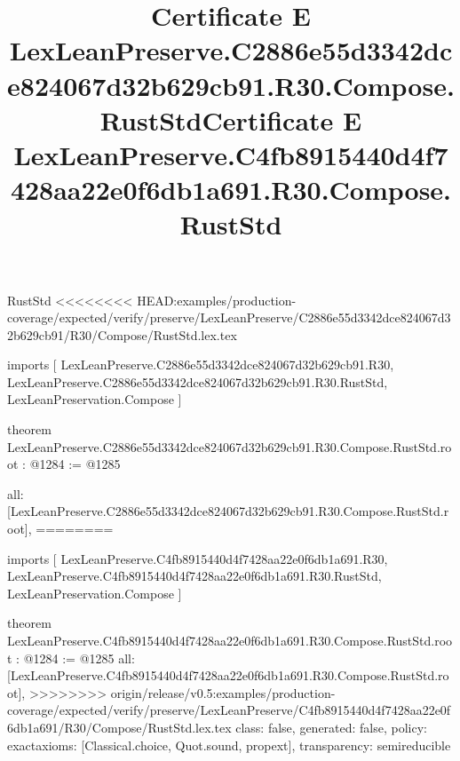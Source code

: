 \begin{lexlean}{RustStd}
<<<<<<<< HEAD:examples/production-coverage/expected/verify/preserve/LexLeanPreserve/C2886e55d3342dce824067d32b629cb91/R30/Compose/RustStd.lex.tex
\title{Certificate E LexLeanPreserve.C2886e55d3342dce824067d32b629cb91.R30.Compose.RustStd}
\begin{coremodule}
imports [
  LexLeanPreserve.C2886e55d3342dce824067d32b629cb91.R30,
  LexLeanPreserve.C2886e55d3342dce824067d32b629cb91.R30.RustStd,
  LexLeanPreservation.Compose
]

theorem LexLeanPreserve.C2886e55d3342dce824067d32b629cb91.R30.Compose.RustStd.root : @1284 := @1285 {
  all: [LexLeanPreserve.C2886e55d3342dce824067d32b629cb91.R30.Compose.RustStd.root],
========
\title{Certificate E LexLeanPreserve.C4fb8915440d4f7428aa22e0f6db1a691.R30.Compose.RustStd}
\begin{coremodule}
imports [
  LexLeanPreserve.C4fb8915440d4f7428aa22e0f6db1a691.R30,
  LexLeanPreserve.C4fb8915440d4f7428aa22e0f6db1a691.R30.RustStd,
  LexLeanPreservation.Compose
]

theorem LexLeanPreserve.C4fb8915440d4f7428aa22e0f6db1a691.R30.Compose.RustStd.root : @1284 := @1285 {
  all: [LexLeanPreserve.C4fb8915440d4f7428aa22e0f6db1a691.R30.Compose.RustStd.root],
>>>>>>>> origin/release/v0.5:examples/production-coverage/expected/verify/preserve/LexLeanPreserve/C4fb8915440d4f7428aa22e0f6db1a691/R30/Compose/RustStd.lex.tex
  class: false,
  generated: false,
  policy: exact{axioms: [Classical.choice, Quot.sound, propext]},
  transparency: semireducible
}


\end{coremodule}}
\end{coremodule}
\end{lexlean}

